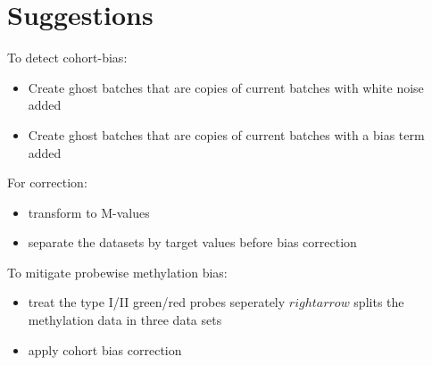 \documentclass[a4paper,10pt]{article}
\begin{document}
%
\section{Suggestions}

To detect cohort-bias:
\begin{itemize}
 \item Create ghost batches that are copies of current batches with white noise added
 \item Create ghost batches that are copies of current batches with a bias term added
\end{itemize}
%
For correction: 
\begin{itemize}
 \item transform to M-values
 \item separate the datasets by target values before bias correction
\end{itemize}
%
To mitigate probewise methylation bias:
\begin{itemize}
 \item treat the type I/II green/red probes seperately $rightarrow$ splits the methylation data in three data sets
 \item apply cohort bias correction
\end{itemize}
%


\end{document}
